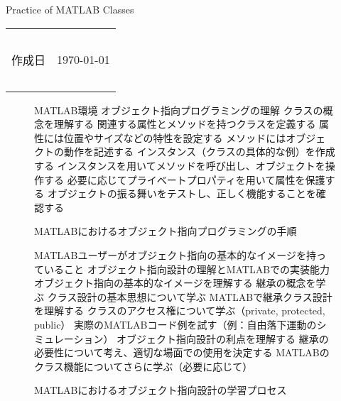 \documentclass[a4]{jarticle}  %
\theoremstyle{definition}
\begin{document}
\begin{center}
{\Large Practice of MATLAB Classes}\\
\end{center}
\begin{flushright}
\begin{tabular}{rr}
{\tiny \ } &\ \\
作成日&\today\\
{\tiny \ } &\ \\
\end{tabular}
\end{flushright}

\begin{figure}[htbp]
  \begin{algorithm}[H]
  \caption{MATLABにおけるオブジェクト指向プログラミングの手順}
  \begin{algorithmic}[1] 
  \REQUIRE MATLAB環境
  \ENSURE オブジェクト指向プログラミングの理解
  \STATE クラスの概念を理解する
  \STATE 関連する属性とメソッドを持つクラスを定義する
  \STATE 属性には位置やサイズなどの特性を設定する
  \STATE メソッドにはオブジェクトの動作を記述する
  \STATE インスタンス（クラスの具体的な例）を作成する
  \STATE インスタンスを用いてメソッドを呼び出し、オブジェクトを操作する
  \STATE 必要に応じてプライベートプロパティを用いて属性を保護する
  \STATE オブジェクトの振る舞いをテストし、正しく機能することを確認する
  \end{algorithmic}
  \end{algorithm}
\end{figure}

\begin{figure}[htbp]
  \begin{algorithm}[H]
  \caption{MATLABにおけるオブジェクト指向設計の学習プロセス}
  \begin{algorithmic}[1] %
  \REQUIRE MATLABユーザーがオブジェクト指向の基本的なイメージを持っていること
  \ENSURE オブジェクト指向設計の理解とMATLABでの実装能力
  \STATE オブジェクト指向の基本的なイメージを理解する
  \STATE 継承の概念を学ぶ
  \STATE クラス設計の基本思想について学ぶ
  \STATE MATLABで継承クラス設計を理解する
  \STATE クラスのアクセス権について学ぶ（private, protected, public）
  \STATE 実際のMATLABコード例を試す（例：自由落下運動のシミュレーション）
  \STATE オブジェクト指向設計の利点を理解する
  \STATE 継承の必要性について考え、適切な場面での使用を決定する
  \STATE MATLABのクラス機能についてさらに学ぶ（必要に応じて）
  \end{algorithmic}
  \end{algorithm}
\end{figure}
\end{document}
